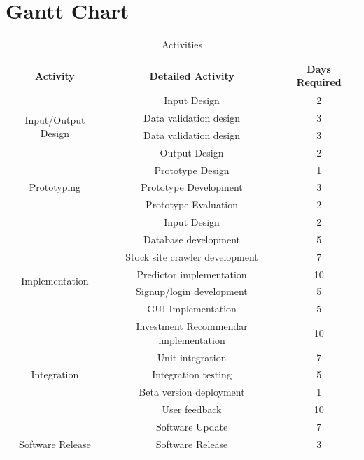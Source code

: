 \documentclass{article}[12pt]
\begin{document}
    


\newpage
\section{Gantt Chart}
    
    \begin{table}[!h]
        \centering
        \begin{tabular}{|c|c|c|} \hline
            Activity & Detailed Activity & Days Required \\ \hline
            
            \multirow{4}{*}{Input/Output Design} & Input Design & 2 \\ 
                & Data validation design & 3 \\ 
                & Data validation design & 3 \\ 
                & Output Design & 2 \\ \hline
                
           \multirow{3}{*}{Prototyping} & Prototype Design & 1 \\ 
                & Prototype Development & 3 \\ 
                & Prototype Evaluation & 2 \\ \hline     
                
            \multirow{7}{*}{Implementation} & Input Design & 2 \\ 
                & Database development & 5 \\ 
                & Stock site crawler development & 7 \\ 
                & Predictor implementation & 10 \\ 
                & Signup/login development & 5 \\ 
                & GUI Implementation & 5 \\ 
                & Investment Recommendar implementation & 10 \\ \hline    
             
             \multirow{3}{*}{Integration} & Unit integration & 7 \\ 
                & Integration testing & 5 \\ \hline   
            
            \multirow{3}{*}{Beta Testing} & Beta version deployment & 1 \\ 
                & User feedback & 10 \\ 
                & Software Update & 7 \\ \hline
            
            Software Release & Software Release & 3 \\ \hline
 
                
        \end{tabular}
        \caption{Activities}
            
    \end{table}
\end{document}

